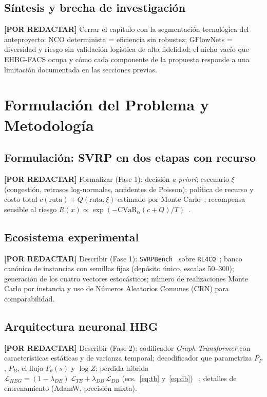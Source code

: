 \documentclass[12pt]{report}
\newcommand{\pendiente}[1]{\par\noindent\colorbox{lightbg}{%
  \begin{minipage}{0.94\linewidth}\small
  \textcolor{uanlgold}{\textbf{[POR REDACTAR]}} #1
  \end{minipage}}\par\medskip}
\begin{document}
\section{S\'intesis y brecha de investigaci\'on}\label{sec:brecha}
\pendiente{Cerrar el cap\'itulo con la segmentaci\'on tecnol\'ogica del
anteproyecto: NCO determinista = eficiencia sin robustez; GFlowNets = diversidad
y riesgo sin validaci\'on log\'istica de alta fidelidad; el nicho vac\'io que
EHBG-FACS ocupa y c\'omo cada componente de la propuesta responde a una
limitaci\'on documentada en las secciones previas.}

\chapter{Formulaci\'on del Problema y Metodolog\'ia}\label{cap:metodologia}

\section{Formulaci\'on: SVRP en dos etapas con recurso}\label{sec:formulacion}
\pendiente{Formalizar (Fase 1): decisi\'on \emph{a priori}; escenario
$\xi$ (congesti\'on, retrasos log-normales, accidentes de Poisson); pol\'itica
de recurso y costo total $c(\text{ruta}) + Q(\text{ruta},\xi)$ estimado por
Monte Carlo~\cite{Gendreau1996Stochastic}; recompensa sensible al riesgo
$R(x)\propto\exp(-\mathrm{CVaR}_\alpha(c+Q)/T)$~\cite{Rockafellar2000CVaR}.}

\section{Ecosistema experimental}\label{sec:ecosistema}
\pendiente{Describir (Fase 1): \texttt{SVRPBench}~\cite{Heakl2025SVRP} sobre
\texttt{RL4CO}~\cite{Berto2023RL4CO}; banco can\'onico de instancias con
semillas fijas (dep\'osito \'unico, escalas 50--300); generaci\'on de los cuatro
vectores estoc\'asticos; n\'umero de realizaciones Monte Carlo por instancia y
uso de N\'umeros Aleatorios Comunes (CRN) para comparabilidad.}

\section{Arquitectura neuronal HBG}\label{sec:arquitectura}
\pendiente{Describir (Fase 2): codificador \textit{Graph Transformer} con
caracter\'isticas est\'aticas y de varianza temporal; decodificador que
parametriza $P_F$, $P_B$, el flujo $F_\theta(s)$ y $\log Z$; p\'erdida h\'ibrida
$\mathcal{L}_{HBG} = (1-\lambda_{DB})\,\mathcal{L}_{TB} +
\lambda_{DB}\,\mathcal{L}_{DB}$ (ecs.~\ref{eq:tb} y~\ref{eq:db})
~\cite{Zhang2025Hybrid}; detalles de entrenamiento (AdamW, precisi\'on mixta).}
\end{document}
